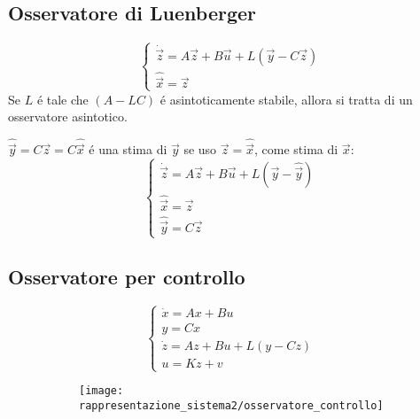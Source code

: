 \documentclass[../main.tex]{subfiles}
\begin{document}
	\subsection{Osservatore di Luenberger}
		\[
			\begin{cases}
				\dot{\vec z} = A \vec z + B \vec u + L (\vec y - C \vec z)\\
				\hat{\vec x} = \vec z
			\end{cases}
		\]
		Se $ L $ \'e tale che $ (A-LC) $ \'e asintoticamente stabile, allora si tratta di un osservatore asintotico.
		
		$ \hat{\vec y} = C \vec z = C \hat{\vec x} $ \'e una stima di $ \vec y $ se uso $ \vec z = \hat{\vec x} $, come stima di $ \vec x $:
		\[
			\begin{cases}
				\dot{\vec z} = A \vec z + B \vec u + L (\vec y - \hat{\vec y})\\
				\hat{\vec x} = \vec z\\
				\hat{\vec y} = C \vec z
			\end{cases}
		\]
		
	\subsection{Osservatore per controllo}
		\begin{figure}[H]
			\begin{subfigure}{0.5\textwidth}
				\[
					\begin{cases}
						\dot x = Ax + Bu\\
						y = Cx\\
						\dot z = Az + Bu + L(y-Cz)\\
						u = Kz + v
					\end{cases}
				\]
			\end{subfigure}
			\begin{subfigure}{0.5\textwidth}
				\centering\texttt{[image: rappresentazione\_sistema2/osservatore\_controllo]}
			\end{subfigure}
		\end{figure}
		
\end{document}
